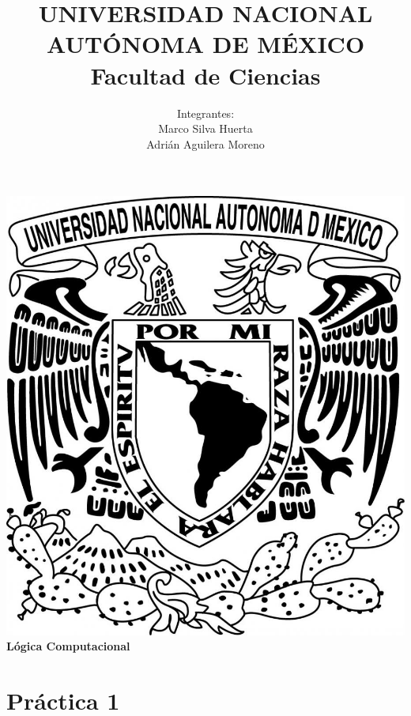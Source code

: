 \documentclass{article}
\begin{document}
\title{UNIVERSIDAD NACIONAL AUT\'ONOMA DE M\'EXICO\\ Facultad de Ciencias}
\author{Integrantes:\\
  Marco Silva Huerta\\
  Adri\'an Aguilera Moreno\\}
\date{}
\maketitle
\begin{center}
  \includegraphics[scale=0.20]{../Imagen/Portada.jpg}\\[0.4cm]
  \Large
  \bf{Lógica Computacional}
  \normalsize
\end{center}
\newpage
{}
\section*{\LARGE{Práctica 1}}
\end{document}
